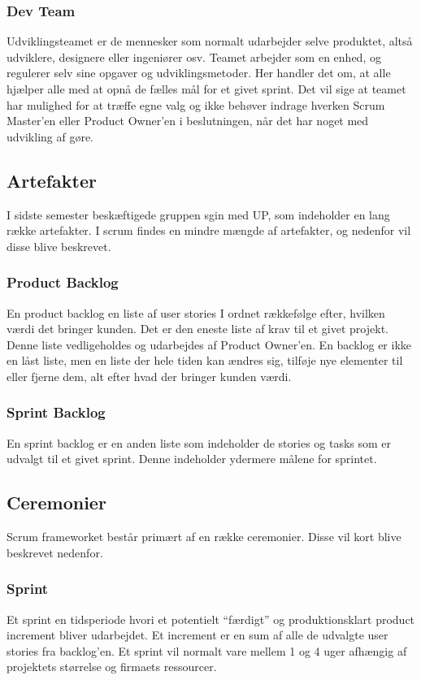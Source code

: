 \subsubsection{Dev Team}
Udviklingsteamet er de mennesker som normalt udarbejder selve produktet, altså udviklere, designere 
eller ingeniører osv. Teamet arbejder som en enhed, og regulerer selv sine opgaver og udviklingsmetoder. 
Her handler det om, at alle hjælper alle med at opnå de fælles mål for et givet sprint. Det vil sige 
at teamet har mulighed for at træffe egne valg og ikke behøver indrage hverken Scrum Master’en eller 
Product Owner’en i beslutningen, når det har noget med udvikling af gøre.

\subsection{Artefakter}
I sidste semester beskæftigede gruppen sgin med UP, som indeholder en lang række artefakter. I scrum findes en mindre mængde af 
artefakter, og nedenfor vil disse blive beskrevet.

\subsubsection{Product Backlog}
En product backlog en liste af user stories I ordnet rækkefølge efter, hvilken værdi det bringer kunden. 
Det er den eneste liste af krav til et givet projekt. Denne liste vedligeholdes og udarbejdes af 
Product Owner’en. En backlog er ikke en låst liste, men en liste der hele tiden kan ændres sig, 
tilføje nye elementer til eller fjerne dem, alt efter hvad der bringer kunden værdi. 

\subsubsection{Sprint Backlog}
En sprint backlog er en anden liste som indeholder de stories og tasks som er udvalgt til et givet sprint. Denne indeholder
ydermere målene for sprintet. 

\subsection{Ceremonier}
Scrum frameworket består primært af en række ceremonier. Disse vil kort blive beskrevet nedenfor.

\subsubsection{Sprint}
Et sprint en tidsperiode hvori et potentielt “færdigt” og produktionsklart product increment bliver udarbejdet. 
Et increment er en sum af alle de udvalgte user stories fra backlog'en. Et sprint vil normalt vare mellem 1 og 4 uger 
afhængig af projektets størrelse og firmaets ressourcer.

